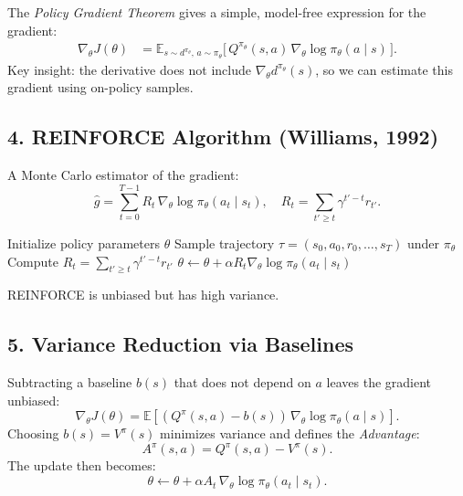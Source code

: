 \documentclass[12pt]{article}
\begin{document}
The \emph{Policy Gradient Theorem} gives a simple, model-free expression for the gradient:
\begin{equation}
		\begin{aligned}
				\nabla_\theta J(\theta)
				&= \mathbb{E}_{s\sim d^{\pi_\theta},\,a\sim\pi_\theta}
				\big[\,Q^{\pi_\theta}(s,a)\,\nabla_\theta\log\pi_\theta(a\mid s)\,\big].
		\end{aligned}
\end{equation}
Key insight: the derivative does not include $\nabla_\theta d^{\pi_\theta}(s)$,
so we can estimate this gradient using on-policy samples.

\subsection*{4. REINFORCE Algorithm (Williams, 1992)}

A Monte Carlo estimator of the gradient:
\[
		\hat{g} = \sum_{t=0}^{T-1} R_t \, \nabla_\theta \log \pi_\theta(a_t\mid s_t),
		\quad
		R_t = \sum_{t' \ge t} \gamma^{t'-t} r_{t'}.
\]
\begin{algorithm}[H]
		\small
		\caption{REINFORCE}
		\begin{algorithmic}[1]
    \State Initialize policy parameters $\theta$
				\State Sample trajectory $\tau = (s_0, a_0, r_0, \ldots, s_T)$ under $\pi_\theta$
				\State Compute $R_t = \sum_{t' \ge t} \gamma^{t'-t} r_{t'}$
				\State $\theta \leftarrow \theta + \alpha R_t \nabla_\theta \log \pi_\theta(a_t \mid s_t)$
				\EndFor
    \EndFor
		\end{algorithmic}
\end{algorithm}

REINFORCE is unbiased but has high variance.

\subsection*{5. Variance Reduction via Baselines}

Subtracting a baseline $b(s)$ that does not depend on $a$ leaves the gradient unbiased:
\[
		\nabla_\theta J(\theta)
		= \mathbb{E}\!\left[ (Q^\pi(s,a) - b(s)) \, \nabla_\theta \log \pi_\theta(a\mid s) \right].
\]
Choosing $b(s) = V^\pi(s)$ minimizes variance and defines the \emph{Advantage}:
\[
		A^\pi(s,a) = Q^\pi(s,a) - V^\pi(s).
\]
The update then becomes:
\[
		\theta \leftarrow \theta + \alpha A_t \, \nabla_\theta \log \pi_\theta(a_t\mid s_t).
\]
\end{document}

